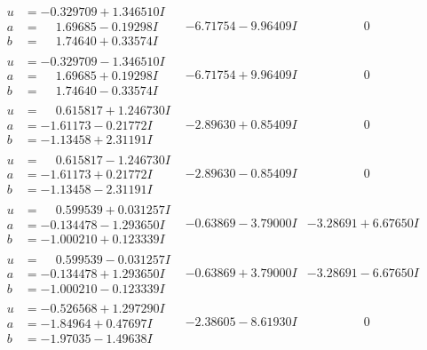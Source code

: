 \documentclass[1p]{elsarticle_modified}
\theoremstyle{definition}
\begin{document}
$$\begin{array}{c|c|c}
\begin{aligned}
u &= -0.329709 + 1.346510 I \\
a &= \phantom{-}1.69685 - 0.19298 I \\
b &= \phantom{-}1.74640 + 0.33574 I\end{aligned}
 & -6.71754 - 9.96409 I & \phantom{-0.000000 } 0 \\ \hline\begin{aligned}
u &= -0.329709 - 1.346510 I \\
a &= \phantom{-}1.69685 + 0.19298 I \\
b &= \phantom{-}1.74640 - 0.33574 I\end{aligned}
 & -6.71754 + 9.96409 I & \phantom{-0.000000 } 0 \\ \hline\begin{aligned}
u &= \phantom{-}0.615817 + 1.246730 I \\
a &= -1.61173 - 0.21772 I \\
b &= -1.13458 + 2.31191 I\end{aligned}
 & -2.89630 + 0.85409 I & \phantom{-0.000000 } 0 \\ \hline\begin{aligned}
u &= \phantom{-}0.615817 - 1.246730 I \\
a &= -1.61173 + 0.21772 I \\
b &= -1.13458 - 2.31191 I\end{aligned}
 & -2.89630 - 0.85409 I & \phantom{-0.000000 } 0 \\ \hline\begin{aligned}
u &= \phantom{-}0.599539 + 0.031257 I \\
a &= -0.134478 - 1.293650 I \\
b &= -1.000210 + 0.123339 I\end{aligned}
 & -0.63869 - 3.79000 I & -3.28691 + 6.67650 I \\ \hline\begin{aligned}
u &= \phantom{-}0.599539 - 0.031257 I \\
a &= -0.134478 + 1.293650 I \\
b &= -1.000210 - 0.123339 I\end{aligned}
 & -0.63869 + 3.79000 I & -3.28691 - 6.67650 I \\ \hline\begin{aligned}
u &= -0.526568 + 1.297290 I \\
a &= -1.84964 + 0.47697 I \\
b &= -1.97035 - 1.49638 I\end{aligned}
 & -2.38605 - 8.61930 I & \phantom{-0.000000 } 0 \\ \hline\begin{aligned}

\end{aligned}
\end{array}$$
\end{document}
